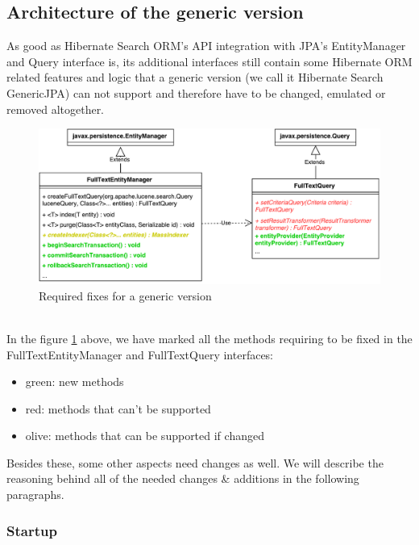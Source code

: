 \pagebreak

\subsection{Architecture of the generic version}

As good as Hibernate Search ORM's API integration with JPA's EntityManager and Query interface is, its additional interfaces still contain some Hibernate ORM related features and logic that a generic version (we call it Hibernate Search GenericJPA) can not support and therefore have to be changed, emulated or removed altogether.
\\
\begin{figure}[ht]
	\centering
	\includegraphics[scale=0.6]{images/hibernate_search_jpa_integration_with_differences.pdf}
	\caption{Required fixes for a generic version}
	\label{hibernate_search_jpa_integration_with_differences}
\end{figure}
\\
In the figure \ref{hibernate_search_jpa_integration_with_differences} above, we have marked all the methods requiring to be fixed in the FullTextEntityManager and FullTextQuery interfaces:
\begin{itemize}
	\item green: new methods
	\item red: methods that can't be supported
	\item olive: methods that can be supported if changed
\end{itemize}
\noindent
Besides these, some other aspects need changes as well. We will describe the reasoning behind all of the needed changes \& additions in the following paragraphs.

\pagebreak

\subsubsection{Startup}

